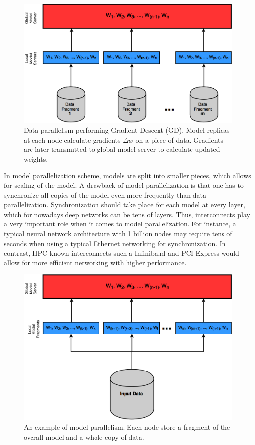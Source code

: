 \documentclass[runningheads,a4paper]{llncs}
\begin{document}
{\begin{figure}[h]
	\includegraphics[scale=0.33]{./images/data_parallel.png}
	\centering
	\caption{Data parallelism performing Gradient Descent (GD). Model replicas at each node calculate gradients $\Delta w $ on a piece of data. Gradients are later transmitted to global model server to calculate updated weights.}
	\label{fig:data_parallelism}
\end{figure}
In model parallelization scheme, models are split into smaller pieces, which allows for scaling of the model. A drawback of model parallelization is that one has to synchronize all copies of the model even more frequently than data parallelization. Synchronization should take place for each model at every layer, which for nowadays deep networks can be tens of layers. Thus, interconnects play a very important role when it comes to model parallelization. For instance, a typical neural network architecture with 1 billion nodes may require tens of seconds when using a typical Ethernet networking for synchronization. In contrast, HPC known interconnects such a Infiniband and PCI Express would allow for more efficient networking with higher performance.\\
\begin{figure}[h]
	\includegraphics[scale=0.33]{./images/model_parallel.png}
	\centering
	\caption{An example of model parallelism. Each node store a fragment of the overall model and a whole copy of data.}
	\label{fig:model_parallelism}
\end{figure}

}
\end{document}
